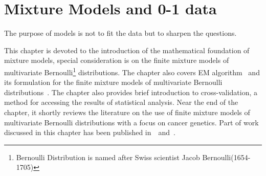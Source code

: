 \chapter{Mixture Models and 0-1 data}
\label{ch:mixturemodels}
\begin{fquote}The purpose of models is not to fit the data but to sharpen the questions. \end{fquote} 

\begin{synopsis}
This chapter is devoted to the introduction of the mathematical foundation of mixture models, special consideration is on the finite mixture models of multivariate Bernoulli\footnote{Bernoulli Distribution is named after Swiss scientist Jacob Bernoulli(1654-1705)} distributions. The chapter also covers EM algorithm~\cite{wolfe, expectmax} and its formulation for the finite mixture models of multivariate Bernoulli distributions~\cite{wolfe, everittmixdist}. The chapter also provides brief introduction to cross-validation, a method for accessing the results of statistical analysis. Near the end of the chapter, it shortly reviews the literature on the use of finite mixture models of multivariate Bernoulli distributions with a focus on cancer genetics. Part of work discussed in this chapter has been published in~\cite{premup}~and~\cite{premprib}.
\end{synopsis}

